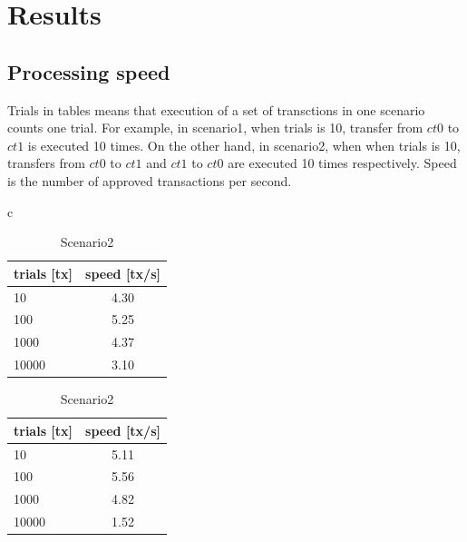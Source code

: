 \documentclass[a4paper, oneside]{discothesis}
\begin{document}
\section{Results}

\subsection{Processing speed}
Trials in tables means that execution of a set of transctions in one scenario counts one trial.
For example, in scenario1, when trials is 10, transfer from $ct0$ to $ct1$ is executed 10 times.
On the other hand, in scenario2, when when trials is 10, transfers from $ct0$ to $ct1$
and $ct1$ to $ct0$ are executed 10 times respectively.
Speed is the number of approved transactions per second.

\begin{table}[htb]
    \begin{center}
        \begin{tabular}{c}

            \begin{minipage}{0.5\hsize}
                \begin{center}
                    \caption{Scenario1}
                    \begin{tabular}{|l|c|} \hline
                        trials [tx] & speed [tx/s]\\ \hline \hline
                        10 & 4.30 \\
                        100 & 5.25 \\
                        1000 & 4.37 \\ 
                        10000 & 3.10 \\ \hline
                    \end{tabular}
                \end{center}
            \end{minipage}

            \begin{minipage}{0.5\hsize}
                \begin{center}
                    \caption{Scenario2}
                    \begin{tabular}{|l|c|} \hline
                        trials [tx] & speed [tx/s]\\ \hline \hline
                        10 & 5.11 \\
                        100 & 5.56 \\
                        1000 & 4.82 \\
                        10000 & 1.52 \\ \hline
                    \end{tabular}
                \end{center}
            \end{minipage}

        \end{tabular}
    \end{center}
\end{table}
\end{document}
